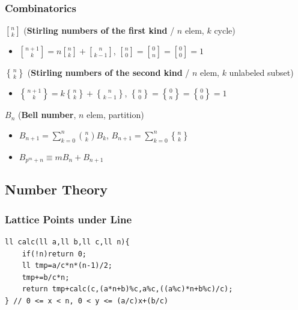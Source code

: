 \documentclass[landscape, 8pt, a4paper, oneside, twocolumn]{extarticle}
\begin{document}
\subsubsection{Combinatorics}

$n \brack k $ (\textbf{Stirling numbers of the first kind} / $n$ elem, $k$ cycle)
\begin{itemize}
    \item ${n+1 \brack k} = n {n \brack k} + {n \brack k-1}$, $ {n \brack 0} = {0 \brack n} = {0 \brack 0} = 1 $
\end{itemize}

$n \brace k $ (\textbf{Stirling numbers of the second kind} / $n$ elem, $k$ unlabeled subset)
\begin{itemize}
    \item ${n+1 \brace k} = k {n \brace k} + {n \brace k-1}$, $ {n \brace 0} = {0 \brace n} = {0 \brace 0} = 1 $
\end{itemize}

$B_n$ (\textbf{Bell number}, $n$ elem, partition)
\begin{itemize}
\item $B_{n+1} = \sum_{k=0}^{n} \binom{n}{k} B_k$, $B_{n+1} = \sum_{k=0}^{n} {n \brace k}$
\item $B_{p^m+n} \equiv m B_n + B_{n+1}$
\end{itemize}

\subsection{Number Theory}
\subsubsection{Lattice Points under Line}
\begin{verbatim}
ll calc(ll a,ll b,ll c,ll n){
    if(!n)return 0;
    ll tmp=a/c*n*(n-1)/2;
    tmp+=b/c*n;
    return tmp+calc(c,(a*n+b)%c,a%c,((a%c)*n+b%c)/c);
} // 0 <= x < n, 0 < y <= (a/c)x+(b/c)
\end{verbatim}
\end{document}
